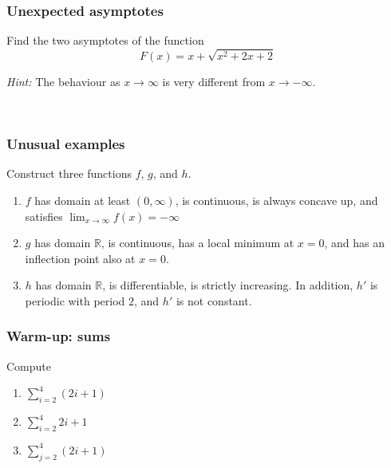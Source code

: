 \begin{frame}[t]
	\frametitle{Unexpected asymptotes}

	Find the two asymptotes of the function
	\[
		F(x) = x + \sqrt{x^{2}+2x+ 2}
	\]

	\emph{Hint:} The behaviour as $x \to \infty$ is very different from
	$x \to - \infty$.

	\ \hfill \href{https://www.desmos.com/calculator/kffnbl6pnc}{}
\end{frame}

\begin{frame}[t]
	\frametitle{Unusual examples}

	Construct three functions $f$, $g$, and $h$.

	\begin{enumerate}
		\item $f$ has domain at least $(0,\infty)$, is continuous, is always concave
			up, and satisfies $\displaystyle \lim_{x \to \infty}f(x) = - \infty$

		\item $g$ has domain $\mathbb{R}$, is continuous, has a local minimum at $x=0$,
			and has an inflection point also at $x=0$.

		\item $h$ has domain $\mathbb{R}$, is differentiable, is strictly increasing.
			In addition, $h'$ is periodic with period $2$, and $h'$ is not constant.
	\end{enumerate}
\end{frame}

\begin{frame}[t]
	\frametitle{Warm-up: sums}

	Compute

	\begin{enumerate}
		\item $\displaystyle \sum_{i=2}^{4}(2i+1)$
			\vfill

		\item $\displaystyle \sum_{i=2}^{4}2i + 1$
			\vfill

		\item $\displaystyle \sum_{j=2}^{4}(2i + 1)$
			\vfill
	\end{enumerate}
\end{frame}


